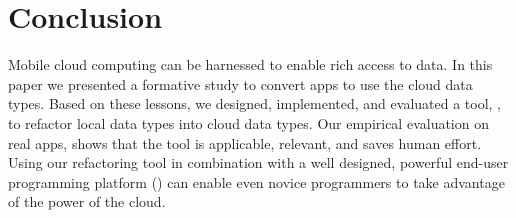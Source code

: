 \documentclass[preprint]{sigplanconf}
\begin{document}
\section{Conclusion}
\label{sec:conclusions}
Mobile cloud computing can be harnessed to enable rich access to data. 
In this paper we presented a formative study to convert \numFormative apps to use the \TD cloud data types. 
Based on these lessons, we designed, implemented, and evaluated a tool,  \tool,  to refactor local data types into cloud data types.  
Our empirical evaluation on \numScripts real apps, shows that the tool is applicable, relevant, and saves human effort.
Using our refactoring tool in combination with a well designed, powerful end-user programming platform (\TD) can enable even novice programmers to take advantage of the power of the cloud.








\end{document}
